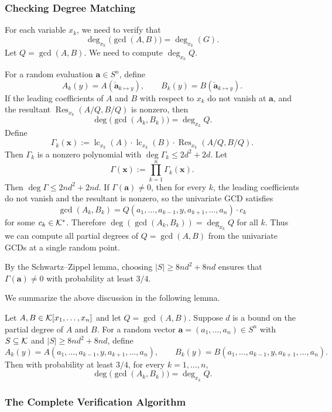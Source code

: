 \documentclass{article}
\numberwithin{equation}{section}
\begin{document}
\subsubsection*{Checking Degree Matching}

For each variable $x_k$, we need to verify that
\[
\deg_{x_k}\bigl(\gcd(A, B)\bigr) = \deg_{x_k}(G).
\]
Let $Q = \gcd(A, B)$. We need to compute $\deg_{x_k} Q$.

For a random evaluation $\mathbf{a} \in S^n$, define
\[
A_k(y) = A(\mathbf{\check{a}}_{k \mapsto y} ), \qquad B_k(y) = B(\mathbf{\check{a}}_{k \mapsto y} ).
\]
If the leading coefficients of $A$ and $B$ with respect to $x_k$ do not vanish at $\mathbf{a}$, and the resultant $\operatorname{Res}_{x_k}(A/Q, B/Q)$ is nonzero, then
\[
\deg\bigl(\gcd(A_k, B_k)\bigr) = \deg_{x_k} Q.
\]
Define
\[
\Gamma_k(\mathbf{x}) := \operatorname{lc}_{x_k}(A) \cdot \operatorname{lc}_{x_k}(B) \cdot \operatorname{Res}_{x_k}(A/Q, B/Q).
\]
Then $\Gamma_k$ is a nonzero polynomial with $\deg \Gamma_k \le 2d^2 + 2d$. Let
\[
\Gamma(\mathbf{x}) := \prod_{k=1}^n \Gamma_k(\mathbf{x}).
\]
Then $\deg \Gamma \le 2nd^2 + 2nd$. If $\Gamma(\mathbf{a}) \neq 0$, then for every $k$,  the leading coefficients do not vanish and the resultant is nonzero, so the univariate GCD satisfies
\[
\gcd(A_k, B_k) = Q(a_1,\dots,a_{k-1}, y, a_{k+1},\dots,a_n) \cdot c_k
\]
for some $c_k \in {\mathcal{K}}^*$. Therefore $\deg(\gcd(A_k, B_k)) = \deg_{x_k} Q$ for all $k$.
%
Thus we can compute all partial degrees of $Q = \gcd(A, B)$ from the univariate GCDs at a single random point.

By the Schwartz--Zippel lemma, choosing $|S| \ge 8nd^2 + 8nd$ ensures that $\Gamma(\mathbf{a}) \neq 0$ with probability at least $3/4$.


We summarize the above discussion in the following lemma.
\begin{lemma}\label{lem:degree-matching}
Let $A, B \in {\mathcal{K}}[x_1,\dots,x_n]$ and let $Q = \gcd(A, B)$. Suppose $d$ is a bound on the partial degree of $A$ and $B$. For a random vector $\mathbf{a}=(a_1,\dots,a_n)\in S^n$ with $S \subseteq {\mathcal{K}}$ and $|S| \ge 8nd^2 + 8nd$, define
\[
A_k(y) = A(a_1,\dots,a_{k-1}, y, a_{k+1},\dots,a_n), \qquad
B_k(y) = B(a_1,\dots,a_{k-1}, y, a_{k+1},\dots,a_n).
\]
Then with probability at least $3/4$, for every $k = 1,\dots,n$,
\[
\deg\bigl(\gcd(A_k, B_k)\bigr) = \deg_{x_k} Q.
\]
\end{lemma}



\subsubsection*{The Complete Verification Algorithm}
\end{document}
